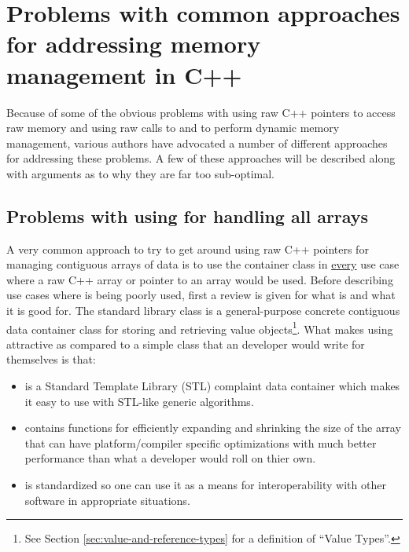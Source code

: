 \documentclass[pdf,ps2pdf,11pt]{SANDreport}
\begin{document}
%
{}\section{Problems with common approaches for addressing memory
management in C++}
\label{sec:current-appraoches-to-mem-mng}
%

Because of some of the obvious problems with using raw C++ pointers to
access raw memory and using raw calls to {} and
{} to perform dynamic memory management, various authors
have advocated a number of different approaches for addressing these
problems.  A few of these approaches will be described along with
arguments as to why they are far too sub-optimal.


%
{}\subsection{Problems with using {} for handling
all arrays}
%

A very common approach to try to get around using raw C++ pointers for
managing contiguous arrays of data is to use the container class
{} in {}\underline{every} use case where a raw C++
array or pointer to an array would be used.  Before describing use
cases where {} is being poorly used, first a review
is given for what {} is and what it is good for.  The
standard library class {} is a general-purpose
concrete contiguous data container class for storing and retrieving
value objects\footnote{See Section
{}\ref{sec:value-and-reference-types} for a definition of ``Value
Types''.}.  What makes using {} attractive as
compared to a simple class that an developer would write for
themselves is that:

\begin{itemize}

{}\item{} is a Standard Template Library (STL)
complaint data container which makes it easy to use with STL-like
generic algorithms.

{}\item{} contains functions for efficiently expanding
and shrinking the size of the array that can have platform/compiler
specific optimizations with much better performance than what a
developer would roll on thier own.

{}\item{} is standardized so one can use it as a means
for interoperability with other software in appropriate situations.

\end{itemize}
\end{document}
